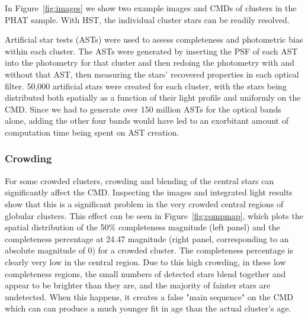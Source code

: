 \documentclass{emulateapj}
\begin{document}
In Figure~\ref{fig:images} we show two example images and CMDs of clusters in the PHAT sample.  With HST, the individual cluster stars can be readily resolved.


Artificial star tests (ASTs) were used to assess completeness and photometric bias within each cluster.  The ASTs were generated by inserting the PSF of each AST into the photometry for that cluster and then redoing the photometry with and without that AST, then measuring the stars' recovered properties in each optical filter.  50,000 artificial stars were created for each cluster, with the stars being distributed both spatially as a function of their light profile and uniformly on the CMD.  Since we had to generate over 150 million ASTs for the optical bands alone, adding the other four bands would have led to an exorbitant amount of computation time being spent on AST creation.

\begin{figure*}[!htbp]
\centering
\mbox{}
\caption{Spatial completeness maps for the dense stellar cluster AP2023.  The left panel shows the spatial distribution of the 50\% completeness magnitude and the right panel shows the completeness percentage at a fixed magnitude of 24.47 (corresponding to an absolute magnitude of 0).  The black circle shows the radial cut at 18 ${\rm mag/arcsec^2}$ in the F814W band which was used to remove photometry from stars within this radius that suffered from extreme crowding.  The overall completeness varies sharply with radius, changing from nearly zero completeness to \textgreater\ 80\% completeness over a change in radius of \textless\ 1".}
\label{fig:compmap}
\end{figure*}




\subsubsection{Crowding}\label{sec:crowding}

For some crowded clusters, crowding and blending of the central stars can significantly affect the CMD.  Inspecting the images and integrated light results show that this is a significant problem in the very crowded central regions of globular clusters.  This effect can be seen in Figure~\ref{fig:compmap}, which plots the spatial distribution of the 50\% completeness magnitude (left panel) and the completeness percentage at 24.47 magnitude (right panel, corresponding to an absolute magnitude of 0) for a crowded cluster.  The completeness percentage is clearly very low in the central region.  Due to this high crowding, in these low completeness regions, the small numbers of detected stars blend together and appear to be brighter than they are, and the majority of fainter stars are undetected.  When this happens, it creates a false "main sequence" on the CMD which can can produce a much younger fit in age than the actual cluster's age.  
\end{document}
